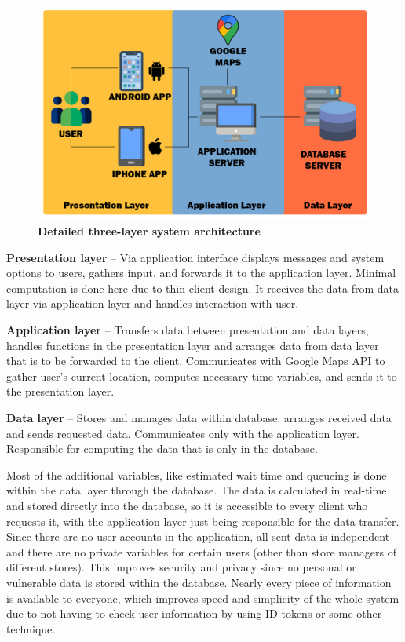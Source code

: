 \begin{figure}[!h]
\centering
\includegraphics[width=\textwidth]{Images/DetailedArchitecturev2}
\caption{\label{fig:detailedarch}\textbf{Detailed three-layer system architecture}}
\end{figure}


\textbf{Presentation layer} – Via application interface displays messages and system options to users, gathers input, and forwards it to the application layer. Minimal computation is done here due to thin client design. It receives the data from data layer via application layer and handles interaction with user. \newline

\textbf{Application layer} – Transfers data between presentation and data layers, handles functions in the presentation layer and arranges data from data layer that is to be forwarded to the client. Communicates with Google Maps API to gather user’s current location, computes necessary time variables, and sends it to the presentation layer.  \newline

\textbf{Data layer} – Stores and manages data within database, arranges received data and sends requested data. Communicates only with the application layer. Responsible for computing the data that is only in the database.  \newline

  

Most of the additional variables, like estimated wait time and queueing is done within the data layer through the database. The data is calculated in real-time and stored directly into the database, so it is accessible to every client who requests it, with the application layer just being responsible for the data transfer. Since there are no user accounts in the application, all sent data is independent and there are no private variables for certain users (other than store managers of different stores). This improves security and privacy since no personal or vulnerable data is stored within the database. Nearly every piece of information is available to everyone, which improves speed and simplicity of the whole system due to not having to check user information by using ID tokens or some other technique. 

